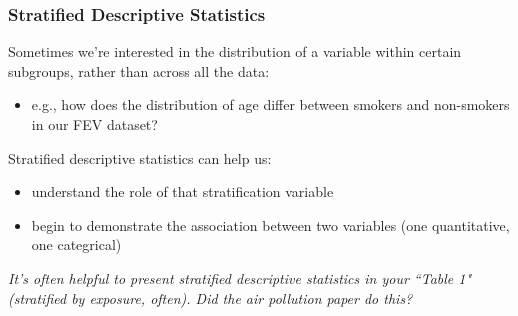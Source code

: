 \documentclass[12pt, 
hyperref={colorlinks=true, linkcolor=blue, urlcolor=cyan}]{beamer}
\begin{document}
\begin{frame}
\frametitle{Stratified Descriptive Statistics} %

Sometimes we're interested in the distribution of a variable within certain subgroups, rather than across all the data: \vspace{-0.3cm}
\begin{itemize}
\item e.g., how does the distribution of age differ between smokers and non-smokers in our FEV dataset? %
\end{itemize}

Stratified descriptive statistics can help us:\vspace{-0.3cm}
\begin{itemize}
\item understand the role of that  stratification variable
\item begin to demonstrate the association between two variables (one quantitative, one categrical)
\end{itemize}

\begin{footnotesize} \textit{It's often helpful to present stratified descriptive statistics in your ``Table 1" (stratified by  exposure, often). Did the air pollution paper do this?} \end{footnotesize}

\end{frame}
\end{document}
